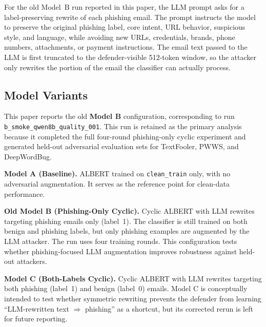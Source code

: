 For the old Model~B run reported in this paper, the LLM prompt asks for a label-preserving rewrite of each phishing email. The prompt instructs the model to preserve the original phishing label, core intent, URL behavior, suspicious style, and language, while avoiding new URLs, credentials, brands, phone numbers, attachments, or payment instructions. The email text passed to the LLM is first truncated to the defender-visible 512-token window, so the attacker only rewrites the portion of the email the classifier can actually process.


\subsection{Model Variants}
This paper reports the old \textbf{Model B} configuration, corresponding to run \texttt{b\_smoke\_qwen8b\_quality\_001}. This run is retained as the primary analysis because it completed the full four-round phishing-only cyclic experiment and generated held-out adversarial evaluation sets for TextFooler, PWWS, and DeepWordBug.

\textbf{Model A (Baseline).} ALBERT trained on \texttt{clean\_train} only, with no adversarial augmentation. It serves as the reference point for clean-data performance.

\textbf{Old Model B (Phishing-Only Cyclic).} Cyclic ALBERT with LLM rewrites targeting phishing emails only (label~1). The classifier is still trained on both benign and phishing labels, but only phishing examples are augmented by the LLM attacker. The run uses four training rounds. This configuration tests whether phishing-focused LLM augmentation improves robustness against held-out attackers.

\textbf{Model C (Both-Labels Cyclic).} Cyclic ALBERT with LLM rewrites targeting both phishing (label~1) and benign (label~0) emails. Model C is conceptually intended to test whether symmetric rewriting prevents the defender from learning ``LLM-rewritten text $\Rightarrow$ phishing'' as a shortcut, but its corrected rerun is left for future reporting.


